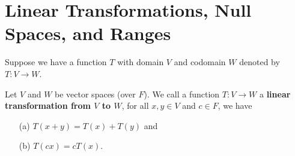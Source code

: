 \section{Linear Transformations, Null Spaces, and Ranges}

Suppose we have a function \( T  \) with domain \( V  \) and codomain \( W  \) denoted by \( T: V \to W  \).


\begin{definition}\label{Linear Transformation}
   Let \( V  \) and \( W  \) be vector spaces (over \( F  \)). We call a function \( T: V \to W  \) a \textbf{linear transformation from \( V  \) to \( W  \)}, for all \( x,y \in V  \) and \( c \in F  \), we have
   \begin{enumerate}
       \item[(a)] \( T(x+y) = T(x) + T(y) \) and
        \item[(b)] \( T(cx) = c T(x) \).
   \end{enumerate}
\end{definition}

